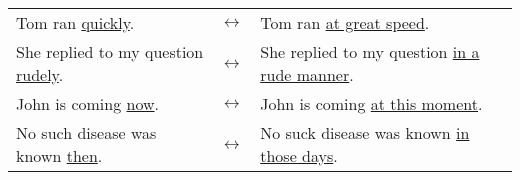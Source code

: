 \begin{enumerate}
\begin{enumerate}
{\begin{tabular}{lll}
                        \\
                        Tom ran \underline{quickly}.
                        & $\leftrightarrow$ &
                        Tom ran \underline{at great speed}.
                        \\
                        She replied to my question \underline{rudely}.
                        & $\leftrightarrow$ &
                        She replied to my question \underline{in a rude manner}.
                        \\
                        John is coming \underline{now}.
                        & $\leftrightarrow$ &
                        John is coming \underline{at this moment}.
                        \\
                        No such disease was known \underline{then}.
                        & $\leftrightarrow$ &
                        No suck disease was known \underline{in those days}.
                    \end{tabular}
                }
                \newline
                \newline


\end{enumerate}
\end{enumerate}
